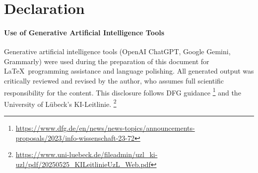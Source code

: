 \cleardoublepage
\thispagestyle{plain}





\section*{Declaration}

\paragraph{Use of Generative Artificial Intelligence Tools}

Generative artificial intelligence tools (OpenAI ChatGPT, Google Gemini, Grammarly)
were used during the preparation of this document for \LaTeX~programming assistance
and language polishing. All generated output was critically reviewed and revised by
the author, who assumes full scientific responsibility for the content.
This disclosure follows DFG guidance%
\footnote{\url{https://www.dfg.de/en/news/news-topics/announcements-proposals/2023/info-wissenschaft-23-72}}
and the University of Lübeck's KI-Leitlinie.%
\footnote{\url{https://www.uni-luebeck.de/fileadmin/uzl_ki-uzl/pdf/20250525_KILeitlinieUzL_Web.pdf}}




